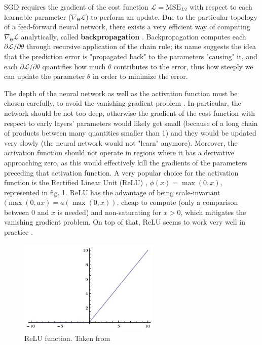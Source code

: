 SGD requires the gradient of the cost function $\mathcal{L}=\text{MSE}_{L2}$ with respect to each learnable parameter ($\nabla_{\bm{\theta}} \mathcal{L}$) to perform an update. Due to the particular topology of a feed-forward neural network, there exists a very efficient way of computing $\nabla_{\bm{\theta}} \mathcal{L}$ analytically, called \textbf{backpropagation} \cite{backprop}. Backpropagation computes each $\partial \mathcal{L}/\partial \theta$ through recursive application of the chain rule; its name suggests the idea that the prediction error is "propagated back" to the parameters "causing" it, and each $\partial \mathcal{L}/\partial \theta$ quantifies how much $\theta$ contributes to the error, thus how steeply we can update the parameter $\theta$ in order to minimize the error.

The depth of the neural network as well as the activation function must be chosen carefully, to avoid the vanishing gradient problem \cite{vanishing_gradient}. In particular, the network should be not too deep, otherwise the gradient of the cost function with respect to early layers' parameters would likely get small (because of a long chain of products between many quantities smaller than 1) and they would be updated very slowly (the neural network would not "learn" anymore). Moreover, the activation function should not operate in regions where it has a derivative approaching zero, as this would effectively kill the gradients of the parameters preceding that activation function. A very popular choice for the activation function is the Rectified Linear Unit (ReLU) \cite{relu}, $\phi(x) = \max(0,x)$, represented in fig. \ref{fig:relu}. ReLU has the advantage of being scale-invariant $(\max(0,ax)=a(\max(0,x))$, cheap to compute (only a comparison between $0$ and $x$ is needed) and non-saturating for $x>0$, which mitigates the vanishing gradient problem. On top of that, ReLU seems to work very well in practice \cite{relu_and_initialization}.

\begin{figure}[hbt!]
    \centering
    \includegraphics[width=0.6\textwidth]{images/relu}
    \caption[ReLU function]{ReLU function. Taken from \cite{cs231n:nn1}}
    \label{fig:relu}
\end{figure}

